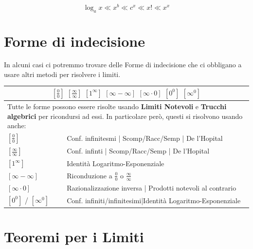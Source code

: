 \documentclass[12pt, a4paper, openany]{book}
\begin{document}
\begin{center}
	\[ \log_ax\ll x^b\ll c^x\ll x! \ll x^x \]
\end{center}

\section{Forme di indecisione}
In alcuni casi ci potremmo trovare delle Forme di indecisione che ci obbligano a usare altri metodi per risolvere i limiti.\\
\begin{tabularx}{\textwidth}{|l|X|}
	\hline
	\multicolumn{2}{|c|}{
		$[\frac{0}{0}]$ $[\frac{\infty}{\infty}]$ $[1^\infty]$ $[\infty - \infty]$ $[\infty \cdot 0]$ $[0^0]$ $[\infty^0]$
	}                                                                                       \\
	\hline
	\multicolumn{2}{|X|}{
		\small{Tutte le forme possono essere risolte usando \textbf{Limiti Notevoli} e \textbf{Trucchi algebrici} per ricondursi ad essi.
			In particolare però, questi si risolvono usando anche:}
	}                                                                                       \\
	\hline
	$[\frac{0}{0}]$           & Conf. infinitesmi | Scomp/Racc/Semp | De l'Hopital          \\
	\hline
	$[\frac{\infty}{\infty}]$ & Conf. infinti | Scomp/Racc/Semp | De l'Hopital              \\
	\hline
	$[1^\infty]$              & Identità Logaritmo-Esponenziale                             \\
	\hline
	$[\infty - \infty]$       & Riconduzione a $\frac{0}{0}$ o $\frac{\infty}{\infty}$      \\
	\hline
	$[\infty \cdot 0]$        & Razionalizzazione inversa | Prodotti notevoli al contrario  \\
	\hline
	$[0^0]$ / $[\infty^0]$    & Conf. infiniti/infinitesimi|Identità Logaritmo-Esponenziale \\
	\hline
\end{tabularx}

\section{Teoremi per i Limiti}
\end{document}
